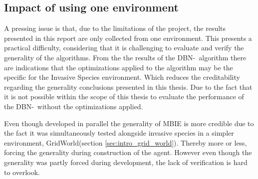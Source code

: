 \subsection{Impact of using one environment }
\label{sec:impact_of_one_env}
A pressing issue is that, due to the limitations of the project, the results presented in this report are only collected from one environment. This presents a practical difficulty, considering that it is challenging to evaluate and verify the generality of the algorithms. From the the results of the DBN-\etre\ algorithm there are indications that the optimizations applied to the algorithm may be the specific for the Invasive Species environment. Which reduces the creditability regarding the generality conclusions presented in this thesis. Due to the fact that it is not possible within the scope of this thesis to evaluate the performance of the DBN-\etre\, without the optimizations applied. 

Even though developed in parallel the generality of MBIE is more credible due to the fact it was simultaneously tested alongside invasive species in a simpler environment, GridWorld(section \ref{sec:intro_grid_world}). Thereby more or less, forcing the generality during construction of the agent. However even though the generality was partly forced during development, the lack of verification is hard to overlook.